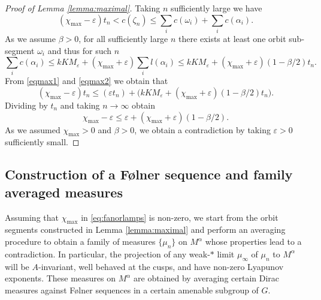 \documentclass[10pt,reqno]{amsart}
\theoremstyle{Theorem}
\theoremstyle{definition}
\theoremstyle{remark}
\newcommand{\note}[1]{\marginpar{{\color{red}\footnotesize \begin{spacing}{1}#1\end{spacing}}}}
\renewcommand{\epsilon}{\varepsilon}
\newcommand{\td}{\tilde}
\newcommand{\e}{\epsilon}
\def\Folner{F{\o}lner }
\def\red{\color{red}}
\begin{document}
\begin{proof}[Proof of Lemma \ref{lemma:maximal}]
Taking $n$  sufficiently large  we have
\begin{equation}\label{eqmax1}
(\chi_{\max} - \e)t_n < c(\zeta_n) \leq \sum_i c(\omega_i) + \sum_i c(\alpha_i).
\end{equation}
As we assume $\beta>0$, for all sufficiently large $n$ there exists at least one orbit sub-segment $\omega_i$ and thus for such $n$
\begin{equation}\label{eqmax2}
\sum_i c(\alpha_i) \leq kKM_{\e} + (\chi_{\max} + \e)\sum_i l(\alpha_i) \leq kKM_{\e} + (\chi_{\max} + \e)(1-  \beta/2   )t_n.
\end{equation}
From   \eqref{eqmax1} and \eqref{eqmax2} we obtain that
\begin{equation}
(\chi_{\max} - \e)t_n \leq   (\epsilon t_n) + \Big(kKM_{\e} + (\chi_{\max} + \e)(1- \beta /2)t_n\Big).
\end{equation}
Dividing by $t_n$ and taking $n \to \infty$ obtain
$$ \chi_{\max} - \e \leq \e  + (\chi_{\max} + \e)(1-  \beta/2).$$
As we assumed $\chi_{\max}>0$ and $\beta > 0$, we obtain a contradiction by taking $\e>0$ sufficiently small.  %
\end{proof}


\subsection{Construction of a \Folner sequence and family averaged measures}
\label{section:folner}
Assuming that $\chi_{\mathrm{max}}$ in \eqref{eq:fanorlamps} is non-zero, we start from the orbit segments constructed in Lemma \ref{lemma:maximal} and perform an averaging procedure to obtain a family of measures $\{  \mu _n\}$ on  $M^\alpha$ whose properties lead to a contradiction.   In particular, %
the projection of any weak-$*$ limit $  \mu _\infty$ of $  \mu _n$  to $M^\alpha$ will be $A$-invariant, well behaved at the cusps, and have non-zero Lyapunov exponents.  These measures on $M^\alpha$ are obtained by averaging certain Dirac measures against \Folner sequences in a certain amenable subgroup of $G$.
\end{document}
